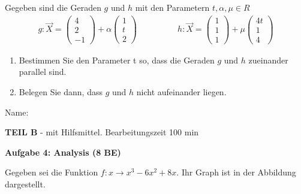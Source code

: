\documentclass[a4paper,12pt]{article}
\newcommand{\Aufgabe}[1]{
  {
  \vspace*{0.5cm}
  \textsf{\textbf{Aufgabe #1}}
  \vspace*{0.2cm}
  
  }
}
\begin{document}
 Gegeben sind die Geraden $g$ und $h$ mit den  Parametern $t, \alpha, \mu  \in R$
\[
\begin {aligned}
   g: \vec{X}= \begin{pmatrix} 4 \\
                              2 \\
                                -1
                  \end{pmatrix}
           + \alpha \begin{pmatrix} 1 \\
                                t\\
                                2
                  \end{pmatrix}
\end {aligned}
\qquad
\qquad
\begin {aligned}
    h: \vec{X}= \begin{pmatrix} 1\\
                              1 \\
                                1
                  \end{pmatrix}
           + \mu \begin{pmatrix} 4t \\
                                1 \\
                                4
                  \end{pmatrix}
\end {aligned}
\]
\begin{enumerate}[label={\alph*)}] 
\item Bestimmen Sie den Parameter t so, dass die Geraden $g$ und $h$ zueinander parallel sind.
\item Belegen Sie dann, dass $g$ und $h$ nicht aufeinander liegen.
\end{enumerate}



\newpage
\enlargethispage{3cm}
Name: \underline{\hspace{7cm}}\\
\begin{center}
{\bf TEIL B} - mit Hilfsmittel. Bearbeitungszeit 100 min
\end{center}

\vspace{2cm}
\Aufgabe{4: Analysis (8 BE)}
Gegeben sei die Funktion $f: x\rightarrow x^3-6x^2+8x $.
Ihr Graph ist in der Abbildung dargestellt.\\
\end{document}
